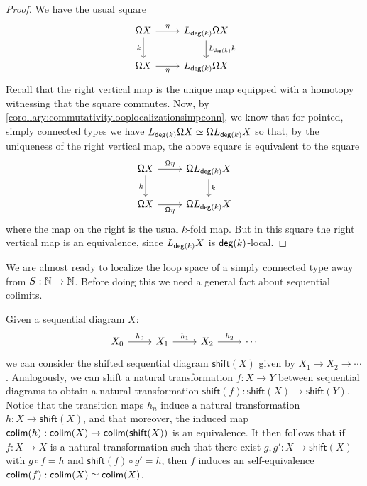 \begin{proof}
    We have the usual square
\begin{equation*}
\begin{tikzcd}
\loopspacesym X \arrow[d,swap,"k"] \arrow[r,"\eta"] & L_{\degg(k)} \loopspacesym X \arrow[d,"L_{\degg(k)} k"] \\
\loopspacesym X \arrow[r,swap,"\eta"] & L_{\degg(k)} \loopspacesym X
\end{tikzcd}
\end{equation*}
    Recall that the right vertical map is the unique map equipped with a homotopy witnessing that the square commutes.
    Now, by \cref{corollary:commutativitylooplocalizationsimpconn}, we know that for pointed, simply connected types we have
    $L_{\mathsf{deg}(k)} \mathsf{\Omega} X \simeq \mathsf{\Omega} L_{\mathsf{deg}(k)} X$ so that,
    by the uniqueness of the right vertical map, the above square is equivalent to the square
\begin{equation*}
\begin{tikzcd}
\loopspacesym X \arrow[d,swap,"k"] \arrow[r,"\loopspacesym \eta"] & \loopspacesym L_{\degg(k)} X \arrow[d,"k"] \\
\loopspacesym X \arrow[r,swap,"\loopspacesym \eta"] & \loopspacesym L_{\degg(k)} X
\end{tikzcd}
\end{equation*}
    where the map on the right is the usual $k$-fold map.
    But in this square the right vertical map is an equivalence, since $L_{\mathsf{deg}(k)} X$
    is $\mathsf{deg}(k)$-local.
\end{proof}

We are almost ready to localize the loop space of a simply connected type away from $S : \mathbb{N} \to \mathbb{N}$.
Before doing this we need a general fact about sequential colimits.

\begin{rmk}\label{remark:equivalenceofseqcolim}
Given a sequential diagram $X$:
\begin{equation*}
\begin{tikzcd}
X_0 \arrow[r,"h_0"] & X_1 \arrow[r,"h_1"] & X_2 \arrow[r,"h_2"] & \cdots
\end{tikzcd}
\end{equation*}
we can consider the shifted sequential diagram $\mathsf{shift}(X)$ given by $X_1 \to X_2 \to \cdots$.
Analogously, we can shift a natural transformation $f : X \to Y$ between sequential
diagrams to obtain a natural transformation $\mathsf{shift}(f):\mathsf{shift}(X)\to\mathsf{shift}(Y)$.
Notice that the transition maps $h_n$ induce a natural transformation $h : X \to \mathsf{shift}(X)$, and that moreover, the
induced map $\mathsf{colim}(h) : \mathsf{colim}(X) \to \mathsf{colim}(\mathsf{shift}(X))$ is an equivalence.
It then follows that if $f : X \to X$ is a natural transformation such that there exist $g, g' : X \to \mathsf{shift}(X)$
with $g \circ f = h$ and $\mathsf{shift}(f) \circ g' = h$, then $f$ induces an self-equivalence $\mathsf{colim}(f) : \mathsf{colim}(X) \simeq \mathsf{colim}(X)$.
\end{rmk}

